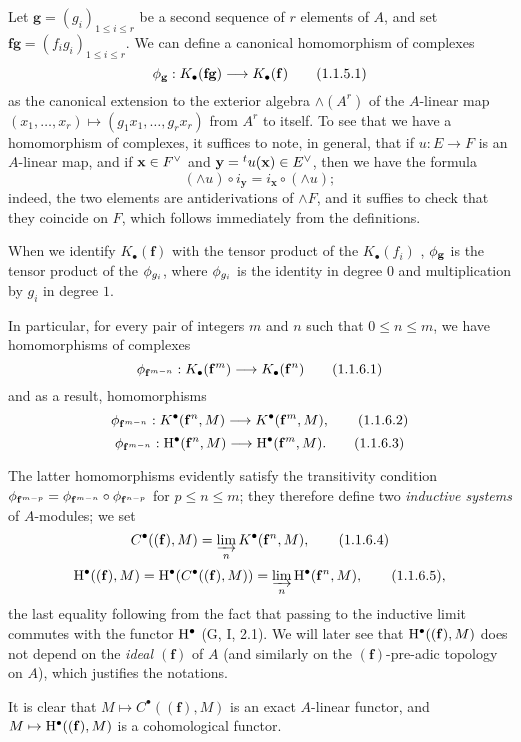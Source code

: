 \begin{env}[1.1.5]
\label{3.1.1.5}
Let $\mathbf{g}=(g_i)_{1\leq i\leq r}$ be a second sequence of $r$ elements of $A$, and set $\mathbf{f}\mathbf{g}=(f_i g_i)_{1\leq i\leq r}$.
We can define a canonical homomorphism of complexes
\[
  \vphi_\mathbf{g}:K_\bullet(\mathbf{f}\mathbf{g})\to K_\bullet(\mathbf{f})
  \tag{1.1.5.1}
\]
as the canonical extension to the exterior algebra $\wedge(A^r)$ of the $A$-linear map $(x_1,\dots,x_r)\mapsto(g_1 x_1,\dots,g_r x_r)$ from $A^r$ to itself.
To see that we have a homomorphism of complexes, it suffices to note, in general, that if $u:E\to F$ is an $A$-linear map, and if $\mathbf{x}\in{F}^\vee$ and $\mathbf{y}={}^t u(\mathbf{x})\in{E}^\vee$, then we have the formula
\[
  (\wedge u)\circ i_\mathbf{y}=i_\mathbf{x}\circ(\wedge u);
  \tag{1.1.5.2}
\]
indeed, the two elements are antiderivations of $\wedge F$, and it suffies to check that they coincide on $F$, which follows immediately from the definitions.

When we identify $K_\bullet(\mathbf{f})$ with the tensor product of the $K_\bullet(f_i)$ , $\phi_\mathbf{g}$ is the tensor product of the $\phi_{g_i}$, where $\phi_{g_i}$ is the identity in degree $0$ and multiplication by $g_i$ in degree $1$.
\end{env}

\begin{env}[1.1.6]
\label{3.1.1.6}
In particular, for every pair of integers $m$ and $n$ such that $0\leq n\leq m$, we have homomorphisms of complexes
\[
  \vphi_{\mathbf{f}^{m-n}}:K_\bullet(\mathbf{f}^m)\to K_\bullet(\mathbf{f}^n)
  \tag{1.1.6.1}
\]
and as a result, homomorphisms
\[
  \vphi_{\mathbf{f}^{m-n}}:K^\bullet(\mathbf{f}^n,M)\to K^\bullet(\mathbf{f}^m,M),
  \tag{1.1.6.2}
\]
\[
  \vphi_{\mathbf{f}^{m-n}}:\HH^\bullet(\mathbf{f}^n,M)\to\HH^\bullet(\mathbf{f}^m,M).
  \tag{1.1.6.3}
\]

The latter homomorphisms evidently satisfy the transitivity condition $\phi_{\mathbf{f}^{m-p}}=\phi_{\mathbf{f}^{m-n}}\circ\phi_{\mathbf{f}^{n-p}}$ for $p\leq n\leq m$; they therefore define two \emph{inductive systems} of $A$-modules; we set
\[
  C^\bullet((\mathbf{f}),M)=\varinjlim_n K^\bullet(\mathbf{f}^n,M),
  \tag{1.1.6.4}
\]
\[
  \mathrm{H}^\bullet((\mathbf{f}),M)=\mathrm{H}^\bullet(C^\bullet((\mathbf{f}),M))=\varinjlim_n\mathrm{H}^\bullet(\mathbf{f}^n,M),
  \tag{1.1.6.5},
\]
the last equality following from the fact that passing to the inductive limit commutes with the functor $\mathrm{H}^\bullet$ (G, I, 2.1).
We will later see  that $\mathrm{H}^\bullet((\mathbf{f}),M)$ does not depend on the \emph{ideal $(\mathbf{f})$} of $A$ (and similarly on the $(\mathbf{f})$-pre-adic topology on $A$), which justifies the notations.

It is clear that $M\mapsto C^\bullet((\mathbf{f}),M)$ is an exact $A$-linear functor, and $M\mapsto\HH^\bullet((\mathbf{f}),M)$ is a cohomological functor.
\end{env}

